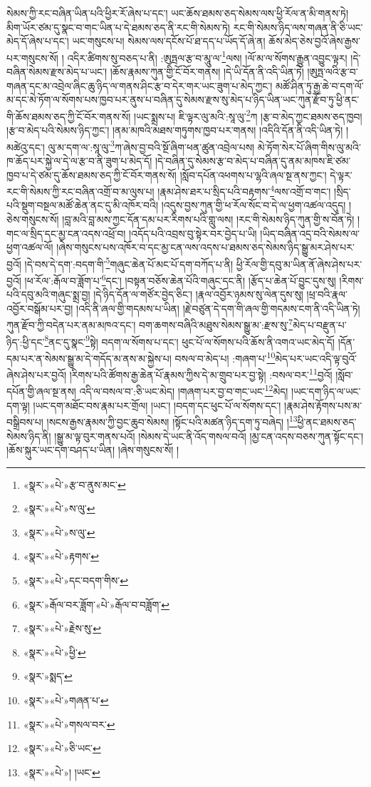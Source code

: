 སེམས་ཀྱི་རང་བཞིན་ཡིན་པའི་ཕྱིར་རོ་ཞེས་པ་དང་། ཡང་ཆོས་ཐམས་ཅད་སེམས་ལས་ཕྱི་རོལ་ན་མི་གནས་ཏེ། མིག་ཡོར་ཙམ་དུ་སྣང་བ་གང་ཡིན་པ་དེ་ཐམས་ཅད་ནི་རང་གི་སེམས་ཏེ། རང་གི་སེམས་ཉིད་ལས་གཞན་ནི་ཅི་ཡང་མེད་དོ་ཞེས་པ་དང་། ཡང་གསུངས་པ། སེམས་ལས་དངོས་པོ་ཐ་དད་པ་ཡོད་དོ་ཞེ་ན། ཆོས་མེད་ཅེས་བྱའོ་ཞེས་རྒྱས་པར་གསུངས་སོ། །
འདིར་ཚིགས་སུ་བཅད་པ་ནི། :ཨུཏྤལ་རྩ་བ་མཱུ་ལ་\footnote{«སྣར་»«པེ་»རྩ་བ་ནུས་མང་}ལས། །ལོ་མ་ལ་སོགས་རྒྱུན་འབྱུང་ལྟར། །དེ་བཞིན་སེམས་རྫས་མེད་པ་ཡང་། །ཆོས་རྣམས་ཀུན་གྱི་ངོ་བོར་གནས། །དེ་ཡི་དོན་ནི་འདི་ཡིན་ཏེ། །ཨུཏྤ་ལའི་རྩ་བ་གཞན་དང་མ་འབྲེལ་ཞིང་ཆུ་ཉིད་ལ་གནས་ཤིང་རྩ་བ་དེར་གར་ཡང་ཟུག་པ་མེད་ཀྱང་། མཚོ་ཤིན་ཏུ་རྒྱ་ཆེ་བ་དག་ལོ་མ་དང་མེ་ཏོག་ལ་སོགས་པས་ཁྱབ་པར་ནུས་པ་བཞིན་དུ་སེམས་རྫས་སུ་མེད་པ་ཉིད་ཡིན་ཡང་ཀུན་རྫོབ་ཏུ་ཕྱི་ནང་གི་ཆོས་ཐམས་ཅད་ཀྱི་ངོ་བོར་གནས་སོ། །ཡང་སྨྲས་པ། ཇི་ལྟར་ལུ་མའི་:སཱ་ལུ་\footnote{«སྣར་»«པེ་»ས་ལུ་}ཀ །རྩ་བ་མེད་ཀྱང་ཐམས་ཅད་ཁྱབ། །རྩ་བ་མེད་པའི་སེམས་ཉིད་ཀྱང་། །ནམ་མཁའི་མཐས་གཏུགས་ཁྱབ་པར་གནས། །འདིའི་དོན་ནི་འདི་ཡིན་ཏེ། །མཚེའུ་དང་། ལུ་མ་དག་ལ་:སཱ་ལུ་\footnote{«སྣར་»«པེ་»ས་ལུ་}ཀ་ཞེས་བྱ་བའི་སྔོ་ཞིག་ཕན་ཚུན་འབྲེལ་པས། མེ་ཏོག་སེར་པོ་ཞིག་གིས་ལུ་མའི་ཁ་ཆོད་པར་སྐྱེ་ལ་དེ་ལ་རྩ་བ་ནི་ཟུག་པ་མེད་དོ། །དེ་བཞིན་དུ་སེམས་རྩ་བ་མེད་པ་བཞིན་དུ་ནམ་མཁས་ཇི་ཙམ་ཁྱབ་པ་དེ་ཙམ་དུ་ཆོས་ཐམས་ཅད་ཀྱི་ངོ་བོར་གནས་སོ། །སློབ་དཔོན་འཕགས་པ་ལྷའི་ཞལ་སྔ་ནས་ཀྱང་། དེ་ལྟར་རང་གི་སེམས་ཀྱི་རང་བཞིན་འགྲོ་བ་མ་ལུས་པ། །རྣམ་ཤེས་ཐར་པ་སྲིད་པའི་བརྟགས་\footnote{«སྣར་»«པེ་»རྟགས་}ལས་འགྲོ་བ་གང་། །སྲིད་པའི་སྡུག་བསྔལ་མཚོ་ཆེན་ནང་དུ་མི་འཁོར་བའི། །འདུས་བྱས་ཀུན་གྱི་ཕ་རོལ་སོང་བ་དེ་ལ་ཕྱག་འཚལ་འདུད། །ཅེས་གསུངས་སོ། །བླ་མའི་བླ་མས་ཀྱང་དོན་དམ་པར་རིགས་པའི་གླུ་ལས། །རང་གི་སེམས་ཉིད་ཀུན་གྱི་ས་བོན་ཏེ། །གང་ལ་སྲིད་དང་མྱ་ངན་འདས་འཕྲོ་བ། །འདོད་པའི་འབྲས་བུ་སྟེར་བར་བྱེད་པ་ཡི། །ཡིད་བཞིན་འདྲ་བའི་སེམས་ལ་ཕྱག་འཚལ་ལོ། །ཞེས་གསུངས་པས་འཁོར་བ་དང་མྱ་ངན་ལས་འདས་པ་ཐམས་ཅད་སེམས་ཉིད་སྒྱུ་མར་ཤེས་པར་བྱའོ། །དེ་བས་དེ་དག་:བདག་གི་\footnote{«སྣར་»«པེ་»དང་བདག་གིས་}གཞུང་ཆེན་པོ་མང་པོ་དག་བཀོད་པ་ནི། ཕྱི་རོལ་གྱི་དབུ་མ་ཡིན་ནོ་ཞེས་ཤེས་པར་བྱའོ། །ཕ་རོལ་:རྒོལ་བ་ཟློག་པ་\footnote{«སྣར་»རྒོལ་བར་ཟློག་«པེ་»རྒོལ་བ་བཟློག་}དང་། །བསྟན་བཅོས་ཆེན་པོའི་གཞུང་དང་ནི། །རྩོད་པ་ཆེན་པོ་བྱུང་དུས་སུ། །རིགས་པའི་དབུ་མའི་གཞུང་སྨྲ་བྱ། །དེ་ཉིད་དོན་ལ་གཙོར་བྱེད་ཅིང་། །རྣལ་འབྱོར་ཉམས་སུ་ལེན་དུས་སུ། །ཕྲ་བའི་རྣལ་འབྱོར་བསྒོམ་པར་བྱ། །འདི་ནི་ཞལ་གྱི་གདམས་པ་ཡིན། །རྗེ་བཙུན་དེ་དག་གི་ཞལ་གྱི་གདམས་ངག་ནི་འདི་ཡིན་ཏེ། ཀུན་རྫོབ་ཀྱི་བདེན་པར་ནམ་མཁའ་དང་། བག་ཆགས་བཞིའི་མཐུས་སེམས་སྒྱུ་མ་:རྫས་སུ་\footnote{«སྣར་»«པེ་»རྗེས་སུ་}མེད་པ་བརྫུན་པ་ཉིད་:ཕྱི་དང་\footnote{«སྣར་»«པེ་»ཕྱི་}ནང་དུ་སྣང་\footnote{«སྣར་»སྨད་}སྟེ། བདག་ལ་སོགས་པ་དང་། ཕུང་པོ་ལ་སོགས་པའི་ཆོས་ནི་འགའ་ཡང་མེད་དོ། །དོན་དམ་པར་ན་སེམས་སྒྱུ་མ་དེ་གདོད་མ་ནས་མ་སྐྱེས་པ། བསལ་བ་མེད་པ། :གཞག་པ་\footnote{«སྣར་»«པེ་»གཞན་པ་}མེད་པར་ཡང་འདི་ལྟ་བུའོ་ཞེས་ཤེས་པར་བྱའོ། །རིགས་པའི་ཚོགས་རྒྱ་ཆེན་པོ་རྣམས་ཀྱིས་དེ་མ་གྲུབ་པར་བྱ་སྟེ། :བསལ་བར་\footnote{«སྣར་»«པེ་»གསལ་བར་}བྱའོ། །སློབ་དཔོན་གྱི་ཞལ་སྔ་ནས། འདི་ལ་བསལ་བ་:ཅི་ཡང་མེད། །གཞག་པར་བྱ་བ་གང་ཡང་\footnote{«སྣར་»«པེ་»ཅི་ཡང་}མེད། །ཡང་དག་ཉིད་ལ་ཡང་དག་ལྟ། །ཡང་དག་མཐོང་བས་རྣམ་པར་གྲོལ། །ཡང་། །བདག་དང་ཕུང་པོ་ལ་སོགས་དང་། །རྣམ་ཤེས་རྟོགས་པས་མ་བསྒྲིབས་པ། །སངས་རྒྱས་རྣམས་ཀྱི་བྱང་ཆུབ་སེམས། །སྟོང་པའི་མཚན་ཉིད་དག་ཏུ་བཞེད། །\footnote{«སྣར་»«པེ་»། །ཡང་}ཕྱི་ནང་ཐམས་ཅད་སེམས་ཉིད་ནི། །སྒྱུ་མ་ལྟ་བུར་གནས་པའོ། །སེམས་དེ་ཡང་ནི་འོད་གསལ་བའོ། །མྱ་ངན་འདས་བཅས་ཀུན་སྟོང་དང་། །ཆོས་སྐུར་ཡང་དག་བཤད་པ་ཡིན། །ཞེས་གསུངས་སོ། །
